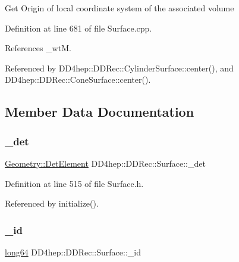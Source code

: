 Get Origin of local coordinate system of the associated volume 

Definition at line 681 of file Surface.\+cpp.



References \+\_\+wtM.



Referenced by D\+D4hep\+::\+D\+D\+Rec\+::\+Cylinder\+Surface\+::center(), and D\+D4hep\+::\+D\+D\+Rec\+::\+Cone\+Surface\+::center().



\subsection{Member Data Documentation}
\hypertarget{class_d_d4hep_1_1_d_d_rec_1_1_surface_a41a9849864ae0888964242798aaaa8e8}{}\label{class_d_d4hep_1_1_d_d_rec_1_1_surface_a41a9849864ae0888964242798aaaa8e8} 
\subsubsection{\texorpdfstring{\+\_\+det}{\_det}}
{\footnotesize\ttfamily \hyperlink{class_d_d4hep_1_1_geometry_1_1_det_element}{Geometry\+::\+Det\+Element} D\+D4hep\+::\+D\+D\+Rec\+::\+Surface\+::\+\_\+det\hspace{0.3cm}{\ttfamily [protected]}}



Definition at line 515 of file Surface.\+h.



Referenced by initialize().

\hypertarget{class_d_d4hep_1_1_d_d_rec_1_1_surface_a14744685350bb3023c3e2efe02f8d707}{}\label{class_d_d4hep_1_1_d_d_rec_1_1_surface_a14744685350bb3023c3e2efe02f8d707} 
\subsubsection{\texorpdfstring{\+\_\+id}{\_id}}
{\footnotesize\ttfamily \hyperlink{namespace_d_d_surfaces_ab6b3da366f31f80aec56447ac4442e78}{long64} D\+D4hep\+::\+D\+D\+Rec\+::\+Surface\+::\+\_\+id\hspace{0.3cm}{\ttfamily [protected]}}



